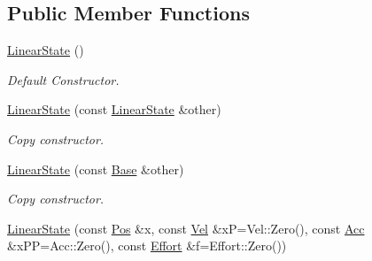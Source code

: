 \subsection*{Public Member Functions}
\begin{DoxyCompactItemize}
\item 
\hyperlink{classow__core_1_1LinearState_a0fa636ea4885fea47d2df258da7619a7}{Linear\+State} ()\hypertarget{classow__core_1_1LinearState_a0fa636ea4885fea47d2df258da7619a7}{}\label{classow__core_1_1LinearState_a0fa636ea4885fea47d2df258da7619a7}

\begin{DoxyCompactList}\small\item\em Default Constructor. \end{DoxyCompactList}\item 
\hyperlink{classow__core_1_1LinearState_a3c79f42470a2a3a8c394a9bc4136d59e}{Linear\+State} (const \hyperlink{classow__core_1_1LinearState}{Linear\+State} \&other)\hypertarget{classow__core_1_1LinearState_a3c79f42470a2a3a8c394a9bc4136d59e}{}\label{classow__core_1_1LinearState_a3c79f42470a2a3a8c394a9bc4136d59e}

\begin{DoxyCompactList}\small\item\em Copy constructor. \end{DoxyCompactList}\item 
\hyperlink{classow__core_1_1LinearState_a02eb2578bcb184286309414ab66d4576}{Linear\+State} (const \hyperlink{classow__core_1_1LinearStateBase}{Base} \&other)\hypertarget{classow__core_1_1LinearState_a02eb2578bcb184286309414ab66d4576}{}\label{classow__core_1_1LinearState_a02eb2578bcb184286309414ab66d4576}

\begin{DoxyCompactList}\small\item\em Copy constructor. \end{DoxyCompactList}\item 
\hyperlink{classow__core_1_1LinearState_a7cc988e99806ebea228089b95ea5bcf8}{Linear\+State} (const \hyperlink{classow__core_1_1LinearPosition}{Pos} \&x, const \hyperlink{classow__core_1_1LinearVelocity}{Vel} \&xP=Vel\+::\+Zero(), const \hyperlink{classow__core_1_1LinearAcceleration}{Acc} \&x\+PP=Acc\+::\+Zero(), const \hyperlink{classow__core_1_1Force}{Effort} \&f=Effort\+::\+Zero())\hypertarget{classow__core_1_1LinearState_a7cc988e99806ebea228089b95ea5bcf8}{}\label{classow__core_1_1LinearState_a7cc988e99806ebea228089b95ea5bcf8}


\end{DoxyCompactItemize}
